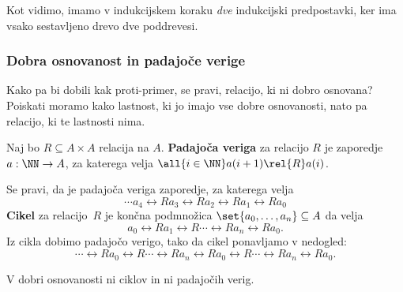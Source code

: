 Kot vidimo, imamo v indukcijskem koraku \emph{dve} indukcijski predpostavki, ker ima vsako
sestavljeno drevo dve poddrevesi.


\subsubsection{Dobra osnovanost in padajoče verige}

Kako pa bi dobili kak proti-primer, se pravi, relacijo, ki ni dobro osnovana? Poiskati
moramo kako lastnost, ki jo imajo vse dobre osnovanosti, nato pa relacijo, ki te lastnosti nima.

\begin{definicija}
  Naj bo $R \subseteq A \times A$ relacija na $A$. \textbf{Padajoča veriga} za relacijo $R$
  je zaporedje $a : \NN \to A$, za katerega velja $\all{i \in \NN} a(i+1) \rel{R} a(i)$.
\end{definicija}

Se pravi, da je padajoča veriga zaporedje, za katerega velja
%
\begin{equation*}
  \cdots a_4 \rel{R} a_3 \rel{R} a_2 \rel{R} a_1 \rel{R} a_0
\end{equation*}
%
\textbf{Cikel} za relacijo~$R$ je končna podmnožica $\set{a_0, \ldots, a_n} \subseteq A$ da velja
%
\begin{equation*}
  a_0 \rel{R} a_1 \rel{R} \cdots \rel{R} a_n \rel{R} a_0.
\end{equation*}
%
Iz cikla dobimo padajočo verigo, tako da cikel ponavljamo v nedogled:
%
\begin{equation*}
  \cdots \rel{R} a_0 \rel{R} \cdots \rel{R} a_n
         \rel{R} a_0 \rel{R} \cdots \rel{R} a_n \rel{R} a_0.
\end{equation*}

\begin{lema}
  V dobri osnovanosti ni ciklov in ni padajočih verig.
\end{lema}

